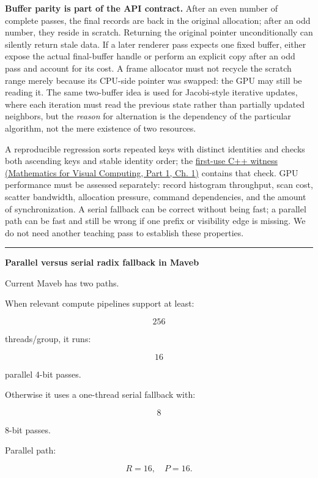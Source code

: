 \textbf{Buffer parity is part of the API contract.} After an even number of complete passes, the final records are back in the original allocation; after an odd number, they reside in scratch. Returning the original pointer unconditionally can silently return stale data. If a later renderer pass expects one fixed buffer, either expose the actual final-buffer handle or perform an explicit copy after an odd pass and account for its cost. A frame allocator must not recycle the scratch range merely because its CPU-side pointer was swapped: the GPU may still be reading it. The same two-buffer idea is used for Jacobi-style iterative updates, where each iteration must read the previous state rather than partially updated neighbors, but the \emph{reason} for alternation is the dependency of the particular algorithm, not the mere existence of two resources.

A reproducible regression sorts repeated keys with distinct identities and checks both ascending keys and stable identity order; the \href{../02-Mathematics-for-Visual-Computing-P01/main.pdf\#source-file-a41016f2e326b40cdff18ff4}{first-use C++ witness (Mathematics for Visual Computing, Part 1, Ch. 1)} contains that check. GPU performance must be assessed separately: record histogram throughput, scan cost, scatter bandwidth, allocation pressure, command dependencies, and the amount of synchronization. A serial fallback can be correct without being fast; a parallel path can be fast and still be wrong if one prefix or visibility edge is missing. We do not need another teaching pass to establish these properties.

\begin{center}\rule{0.5\linewidth}{0.5pt}\end{center}

\textbf{Parallel versus serial radix fallback in Maveb}

Current Maveb has two paths.

When relevant compute pipelines support at least:

\[
256
\]

threads/group, it runs:

\[
16
\]

parallel 4-bit passes.

Otherwise it uses a one-thread serial fallback with:

\[
8
\]

8-bit passes.

Parallel path:

\[
R=16,
\quad
P=16.
\]

